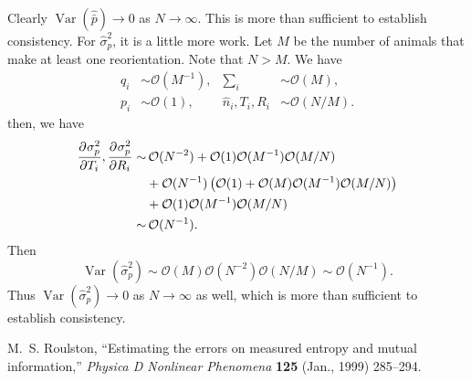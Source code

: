 \documentclass[12pt]{article}
\newcommand{\pdiff}[3][\rule{0mm}{0mm}]{\frac{\partial^{#1} #2}{\partial {#3}^{#1}}}
\newcommand{\CO}{\mathcal{O}}
\DeclareMathOperator{\var}{Var}
\newcommand{\prn}[1]{\left ( #1 \right )}
\begin{document}
Clearly $\var(\hat{\bar{p}})\to0$ as $N\to\infty$. This is more than sufficient to establish consistency. For $\hat{\sigma}_p^2$, it is a little more work. Let $M$ be the number of animals that make at least one reorientation. Note that $N>M$. We have
%
\begin{equation}\label{eq:orderNM}
  \begin{aligned}
    q_i &\sim \CO(M^{-1}),
    & \sum_i &\sim \CO(M), \\
    p_i &\sim \CO(1),
    & \hat{n}_i,T_i,R_i &\sim \CO(N/M).
  \end{aligned}
\end{equation}
%
then, we have
%
\begin{equation}\label{eq:coefforder}
  \begin{aligned}
    \pdiff{\sigma_p^2}{T_i},\pdiff{\sigma_p^2}{R_i}  \sim&\,
    \CO(N^{-2}) + \CO(1)\CO(M^{-1})\CO(M/N) \\&+ \CO(N^{-1})\prn{\CO(1) + \CO(M)\CO(M^{-1})\CO(M/N)} \\&+ \CO(1)\CO(M^{-1})\CO(M/N)\\
      \sim&\, \CO(N^{-1}).
  \end{aligned}
\end{equation}
%
Then
%
\begin{equation}\label{eq:ordervarvarp}
  \var(\hat{\sigma}_p^2) \sim \CO(M)\CO(N^{-2})\CO(N/M) \sim \CO(N^{-1}).
\end{equation}
%
Thus $\var(\hat{\sigma}_p^2)\to0$ as $N\to\infty$ as well, which is more than sufficient to establish consistency.












\providecommand{\href}[2]{#2}
\begingroup\raggedright
\begin{thebibliography}{1}

  M.~S. {Roulston},
  ``{Estimating the errors on measured entropy and mutual information},''
  \href{http://dx.doi.org/10.1016/S0167-2789(98)00269-3}{{\em Physica D Nonlinear Phenomena} {\bf 125} (Jan., 1999)  285--294}.

\end{thebibliography}
\endgroup
\end{document}
